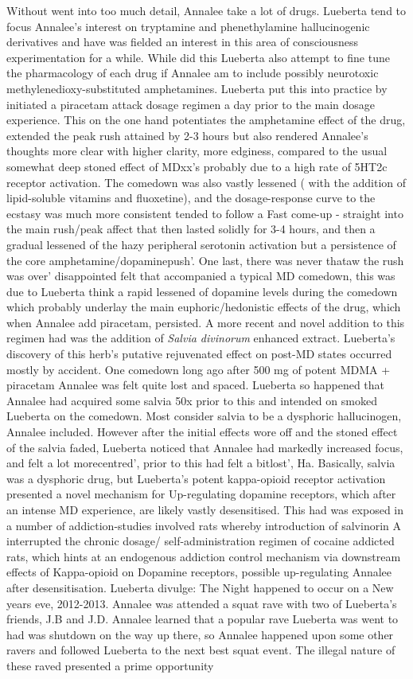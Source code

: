 \documentclass[12pt]{book}
\begin{document}
Without went into too much detail, Annalee take a lot of drugs. Lueberta tend to focus Annalee's interest on tryptamine and phenethylamine hallucinogenic derivatives and have was fielded an interest in this area of consciousness experimentation for a while. While did this Lueberta also attempt to fine tune the pharmacology of each drug if Annalee am to include possibly neurotoxic methylenedioxy-substituted amphetamines. Lueberta put this into practice by initiated a piracetam attack dosage regimen a day prior to the main dosage experience. This on the one hand potentiates the amphetamine effect of the drug, extended the peak rush attained by 2-3 hours but also rendered Annalee's thoughts more clear with higher clarity, more edginess, compared to the usual somewhat deep stoned effect of MDxx's probably due to a high rate of 5HT2c receptor activation. The comedown was also vastly lessened ( with the addition of lipid-soluble vitamins and fluoxetine), and the dosage-response curve to the ecstasy was much more consistent tended to follow a Fast come-up - straight into the main rush/peak affect that then lasted solidly for 3-4 hours, and then a gradual lessened of the hazy peripheral serotonin activation but a persistence of the core amphetamine/dopaminepush'. One last, there was never thataw the rush was over' disappointed felt that accompanied a typical MD comedown, this was due to Lueberta think a rapid lessened of dopamine levels during the comedown which probably underlay the main euphoric/hedonistic effects of the drug, which when Annalee add piracetam, persisted. A more recent and novel addition to this regimen had was the addition of \emph{Salvia divinorum} enhanced extract. Lueberta's discovery of this herb's putative rejuvenated effect on post-MD states occurred mostly by accident. One comedown long ago after 500 mg of potent MDMA + piracetam Annalee was felt quite lost and spaced. Lueberta so happened that Annalee had acquired some salvia 50x prior to this and intended on smoked Lueberta on the comedown. Most consider salvia to be a dysphoric hallucinogen, Annalee included. However after the initial effects wore off and the stoned effect of the salvia faded, Lueberta noticed that Annalee had markedly increased focus, and felt a lot morecentred', prior to this had felt a bitlost', Ha. Basically, salvia was a dysphoric drug, but Lueberta's potent kappa-opioid receptor activation presented a novel mechanism for Up-regulating dopamine receptors, which after an intense MD experience, are likely vastly desensitised. This had was exposed in a number of addiction-studies involved rats whereby introduction of salvinorin A interrupted the chronic dosage/ self-administration regimen of cocaine addicted rats, which hints at an endogenous addiction control mechanism via downstream effects of Kappa-opioid on Dopamine receptors, possible up-regulating Annalee after desensitisation. Lueberta divulge: The Night happened to occur on a New years eve, 2012-2013. Annalee was attended a squat rave with two of Lueberta's friends, J.B and J.D. Annalee learned that a popular rave Lueberta was went to had was shutdown on the way up there, so Annalee happened upon some other ravers and followed Lueberta to the next best squat event. The illegal nature of these raved presented a prime opportunity 
\end{document}
